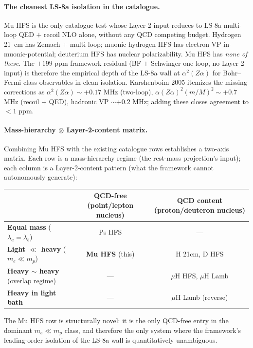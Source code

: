 \documentclass[11pt]{article}
\begin{document}
\paragraph{The cleanest LS-8a isolation in the catalogue.}  Mu HFS
is the only catalogue test whose Layer-2 input reduces to LS-8a
multi-loop QED $+$ recoil NLO alone, without any QCD competing budget.
Hydrogen 21~cm has Zemach + multi-loop; muonic hydrogen HFS has
electron-VP-in-muonic-potential; deuterium HFS has nuclear polarizability.
Mu HFS has \emph{none of these}.  The $+199$ ppm framework residual
(BF $+$ Schwinger one-loop, no Layer-2 input) is therefore the
empirical depth of the LS-8a wall at $\alpha^2(Z\alpha)$ for
Bohr--Fermi-class observables in clean isolation.  Karshenboim 2005
itemizes the missing corrections as $\alpha^2(Z\alpha) \sim +0.17$ MHz
(two-loop), $\alpha(Z\alpha)^2(m/M)^2 \sim +0.7$ MHz (recoil $+$ QED),
hadronic VP $\sim +0.2$ MHz; adding these closes agreement to
$<1$ ppm.

\paragraph{Mass-hierarchy $\otimes$ Layer-2-content matrix.}
Combining Mu HFS with the existing catalogue rows establishes a
two-axis matrix.  Each row is a mass-hierarchy regime (the rest-mass
projection's input); each column is a Layer-2-content pattern
(what the framework cannot autonomously generate):

\begin{center}
\begin{tabular}{l|cc}
\toprule
& \textbf{QCD-free} (point/lepton nucleus) & \textbf{QCD content} (proton/deuteron nucleus) \\
\midrule
\textbf{Equal mass} ($\lambda_a = \lambda_b$) & Ps HFS & --- \\
\textbf{Light $\ll$ heavy} ($m_e \ll m_p$) & \textbf{Mu HFS} (this) & H 21cm, D HFS \\
\textbf{Heavy $\sim$ heavy} (overlap regime) & --- & $\mu$H HFS, $\mu$H Lamb \\
\textbf{Heavy in light bath} & --- & $\mu$H Lamb (reverse) \\
\bottomrule
\end{tabular}
\end{center}

The Mu HFS row is structurally novel: it is the only QCD-free entry
in the dominant $m_e \ll m_p$ class, and therefore the only system
where the framework's leading-order isolation of the LS-8a wall is
quantitatively unambiguous.
\end{document}
